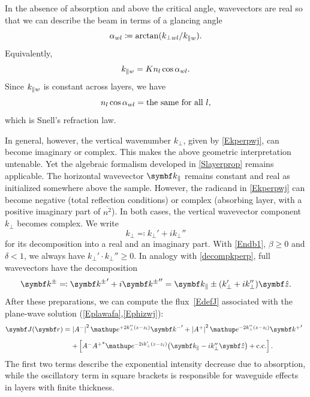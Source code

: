 In the absence of absorption and above the critical angle,
wavevectors are real
so that we can describe the beam in terms of a glancing angle
\begin{equation}\label{Edef_alpha}
  \alpha_{wl}\coloneqq \arctan(k_{\perp wl}/k_{\parallel w}).
\end{equation}
Equivalently,
\begin{equation}
  k_{\parallel w}=K n_l \cos\alpha_{wl}.
\end{equation}
Since $k_{\parallel w}$ is constant across layers,
we have
\begin{equation}\label{ESnell}
  n_l \cos\alpha_{wl} = \text{the same for all }l,
\end{equation}
which is Snell's refraction law.

In general, however, the vertical wavenumber $k_{\perp}$,
given by \cref{Ekperpwj},
can become imaginary or complex.
This makes the above geometric interpretation untenable.
Yet the algebraic formalism developed in \cref{Slayerprop}
remains applicable.
The horizontal wavevector $\k_\plll$ remains constant and real
as initialized somewhere above the sample.
However, the radicand in \cref{Ekperpwj} can become
negative (total reflection conditions) or complex
(absorbing layer,
with a positive imaginary part of $\overline{n^2}$).
In both cases, the vertical wavevector component $k_{\perp}$
becomes complex.
%
We write
\begin{equation}\label{decompkperp}
  k_\perp \eqqcolon k_\perp' + i k_\perp''
\end{equation}
for its decomposition into a real and an imaginary part.
With \cref{Endb1}, $\beta\ge0$ and $\delta<1$,
we always have $k_\perp'\cdot k_\perp''\ge0$.
In analogy with \cref{decompkperp},
full wavevectors have the decomposition
\begin{equation}
  \k^\pm
  \eqqcolon {\k^\pm}' + i{\k^\pm}''
  = \k_\plll \pm (k_\perp' + i k_\perp'')\v{\hat z}.
\end{equation}
After these preparations,
we can compute the flux~\cref{EdefJ}
associated with the plane-wave solution (\ref{Eplawafa},\ref{Ephizwj}):
\begin{equation}
  \begin{array}{@{}l@{\;}l}
  \v{J}(\r)
  =&   \left|A^-\right|^2 \e^{+2k_\perp'' (z-z_l)} {\k^-}'
    + \left|A^+\right|^2 \e^{-2k_\perp''(z-z_l)} {\k^+}'
\\[2ex]
  &+ \left[
      A^-{A^+}^* \e^{-2ik_\perp'(z-z_l)} {\left(\k_\plll-ik_\perp''\v{\hat z}\right)}
    + \text{c.c.}
    \right].
  \end{array}
\end{equation}
The first two terms describe the exponential intensity decrease
due to absorption, while
the oscillatory term in square brackets
is responsible for waveguide effects in layers with finite thickness.

